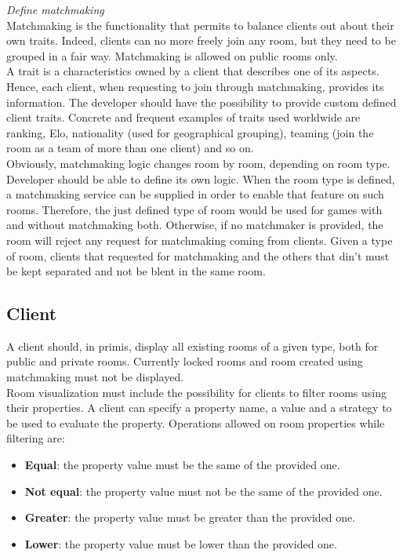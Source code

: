 \bigskip
\textit{Define matchmaking}
\\
Matchmaking is the functionality that permits to balance clients out about their own traits. Indeed, clients can no more freely join any room, but they need to be grouped in a fair way. Matchmaking is allowed on public rooms only.   
\\
A trait is a characteristics owned by a client that describes one of its aspects. Hence, each client, when requesting to join through matchmaking, provides its information. The developer should have the possibility to provide custom defined client traits. Concrete and frequent examples of traits used worldwide are ranking, Elo, nationality (used for geographical grouping), teaming (join the room as a team of more than one client) and so on.
\\
Obviously, matchmaking logic changes room by room, depending on room type. Developer should be able to define its own logic.
When the room type is defined, a matchmaking service can be supplied in order to enable that feature on such rooms. Therefore, the just defined type of room would be used for games with and without matchmaking both. Otherwise, if no matchmaker is provided, the room will reject any request for matchmaking coming from clients.
Given a type of room, clients that requested for matchmaking and the others that din't must be kept separated and not be blent in the same room.

\subsection{Client} \label{client}

A client should, in primis, display all existing rooms of a given type, both for public and private rooms. Currently locked rooms and room created using matchmaking must not be displayed.
\\
Room visualization must include the possibility for clients to filter rooms using their properties. A client can specify a property name, a value and a strategy to be used to evaluate the property. Operations allowed on room properties while filtering are:
\begin{itemize}
\item \textbf{Equal}: the property value must be the same of the provided one.
\item \textbf{Not equal}: the property value must not be the same of the provided one.
\item \textbf{Greater}: the property value must be greater than the provided one.
\item \textbf{Lower}: the property value must be lower than the provided one.
\end{itemize}

